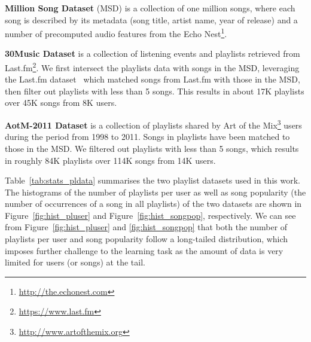 {\bf Million Song Dataset} (MSD) is a collection of one million songs, where each song is described by its metadata 
(\eg song title, artist name, year of release) and a number of precomputed audio features from the Echo Nest\footnote{\url{http://the.echonest.com}}.

{\bf 30Music Dataset} is a collection of listening events and playlists retrieved from Last.fm\footnote{\url{https://www.last.fm}}.
We first intersect the playlists data with songs in the MSD, leveraging the Last.fm dataset~\cite{lastfmdataset}
which matched songs from Last.fm with those in the MSD, then filter out playlists with less than 5 songs.
This results in about 17K playlists over 45K songs from 8K users.

{\bf AotM-2011 Dataset} is a collection of playlists shared by Art of the Mix\footnote{\url{http://www.artofthemix.org}} 
users during the period from 1998 to 2011. Songs in playlists have been matched to those in the MSD.
We filtered out playlists with less than 5 songs, which results in roughly 84K playlists over 114K songs from 14K users.

Table~\ref{tab:stats_pldata} summarises the two playlist datasets used in this work.
The histograms of the number of playlists per user as well as song popularity 
(\ie the number of occurrences of a song in all playlists)
of the two datasets are shown in Figure~\ref{fig:hist_pluser} and Figure~\ref{fig:hist_songpop},
respectively.
We can see from Figure~\ref{fig:hist_pluser} and \ref{fig:hist_songpop} that both the number
of playlists per user and song popularity follow a long-tailed distribution, which imposes further challenge to the learning task 
as the amount of data is very limited for users (or songs) at the tail.


\begin{table}[hbt]
\centering
\caption{Music playlist dataset}
\label{tab:stats_pldata}
\end{table}


